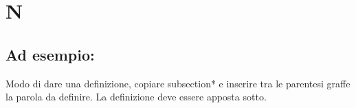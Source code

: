 \section*{N}
\markright{}
\subsection*{Ad esempio:}
Modo di dare una definizione, copiare subsection*{} e inserire tra le parentesi graffe la parola da definire. La definizione deve essere apposta sotto.